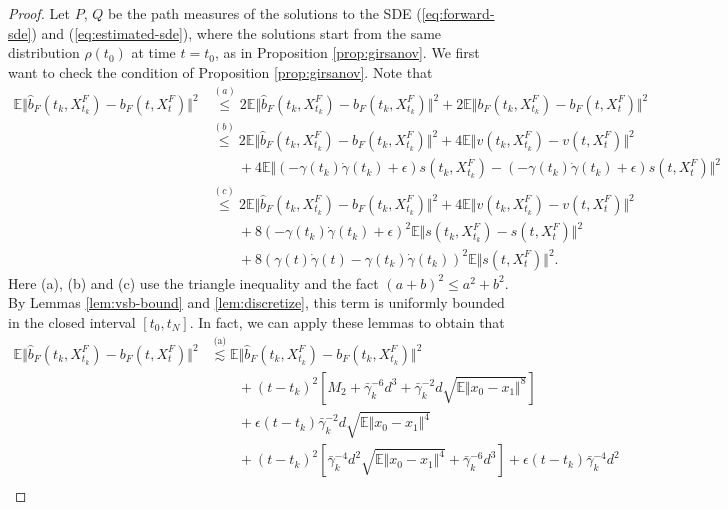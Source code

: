 \begin{proof}
    Let $P$, $Q$ be the path measures of the solutions to the SDE (\ref{eq:forward-sde}) and (\ref{eq:estimated-sde}), where the solutions start from the same distribution $\rho(t_0)$ at time $t=t_0$, as in Proposition \ref{prop:girsanov}. We first want to check the condition of Proposition \ref{prop:girsanov}. Note that 
    $$\begin{aligned}
        \mathbb{E}\Vert\hat{b}_F(t_k,X_{t_k}^F)-b_F(t,X_t^F)\Vert^2&\overset{(a)}{\le}2\mathbb{E}\Vert\hat{b}_F(t_k,X_{t_k}^F)-b_F(t_k,X_{t_k}^F)\Vert^2+2\mathbb{E}\Vert b_F(t_k,X_{t_k}^F)-b_F(t,X_t^F)\Vert^2\\
        &\overset{(b)}{\le}2\mathbb{E}\Vert\hat{b}_F(t_k,X_{t_k}^F)-b_F(t_k,X_{t_k}^F)\Vert^2+4\mathbb{E}\Vert v(t_k,X_{t_k}^F)-v(t,X_t^F)\Vert^2\\
        &\qquad+4\mathbb{E}\Vert(-\gamma(t_k)\dot{\gamma}(t_k)+\epsilon)s(t_k,X_{t_k}^F)-(-\gamma(t_k)\dot{\gamma}(t_k)+\epsilon)s(t,X_t^F)\Vert^2\\
        &\overset{(c)}{\le}2\mathbb{E}\Vert\hat{b}_F(t_k,X_{t_k}^F)-b_F(t_k,X_{t_k}^F)\Vert^2+4\mathbb{E}\Vert v(t_k,X_{t_k}^F)-v(t,X_t^F)\Vert^2\\
        &\qquad+8(-\gamma(t_k)\dot{\gamma}(t_k)+\epsilon)^2\mathbb{E}\Vert s(t_k,X_{t_k}^F)-s(t,X_t^F)\Vert^2\\
        &\qquad+8(\gamma(t)\dot{\gamma}(t)-\gamma(t_k)\dot{\gamma}(t_k))^2\mathbb{E}\Vert s(t,X_t^F)\Vert^2.
    \end{aligned}$$
    Here (a), (b) and (c) use the triangle inequality and the fact $(a+b)^2\le a^2+b^2$. By Lemmas \ref{lem:vsb-bound} and \ref{lem:discretize}, this term is uniformly bounded in the closed interval $[t_0,t_N]$. In fact, we can apply these lemmas to obtain that
    $$\begin{aligned}
        \mathbb{E}\Vert\hat{b}_F(t_k,X_{t_k}^F)-b_F(t,X_t^F)\Vert^2&\overset{\text{(a)}}{\lesssim}\mathbb{E}\Vert\hat{b}_F(t_k,X_{t_k}^F)-b_F(t_k,X_{t_k}^F)\Vert^2\\
        &\qquad+(t-t_k)^2\left[M_2+\bar{\gamma}_k^{-6}d^3+\bar{\gamma}_k^{-2}d\sqrt{\mathbb{E}\Vert x_0-x_1\Vert^{8}}\right]\\
        &\qquad+\epsilon(t-t_k)\bar{\gamma}_k^{-2}d\sqrt{\mathbb{E}\Vert x_0-x_1\Vert^{4}}\\
        &\qquad+(t-t_k)^2\left[\bar{\gamma}_k^{-4}d^2\sqrt{\mathbb{E}\Vert x_0-x_1\Vert^4}+\bar{\gamma}_k^{-6}d^3\right]+\epsilon(t-t_k)\bar{\gamma}_k^{-4}d^2\\

\end{aligned}$$
\end{proof}
